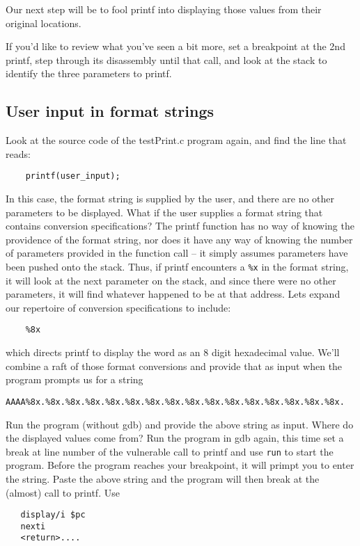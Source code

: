 Our next step will be to fool printf into displaying those values from their original locations.

If you'd like to review what you've seen a bit more, set a breakpoint at the 2nd printf, step through
its disassembly until that call, and look at the stack to identify the three parameters to printf.

\subsection{User input in format strings}
Look at the source code of the testPrint.c program again, and find the line that reads:
\begin{verbatim}
    printf(user_input);
\end{verbatim}
\noindent In this case, the format string is supplied by the user, and there are no other parameters to be
displayed.  What if the user supplies a format string that contains conversion specifications?  The printf
function has no way of knowing the providence of the format string, nor does it have any way of knowing the
number of parameters provided in the function call -- it simply assumes parameters have been pushed onto the
stack.  Thus, if printf encounters a {\tt \%x} in the format string, it will look at the next parameter on the
stack, and since there were no other parameters, it will find whatever happened to be at that address.
Lets expand our repertoire of conversion specifications to include:
\begin{verbatim}
    %8x
\end{verbatim}
\noindent which directs printf to display the word as an 8 digit hexadecimal value.  We'll combine a raft of
those format conversions and provide that as input when the program prompts us for a string
\begin{verbatim}
AAAA%8x.%8x.%8x.%8x.%8x.%8x.%8x.%8x.%8x.%8x.%8x.%8x.%8x.%8x.%8x.%8x.
\end{verbatim}
Run the program (without gdb) and provide the above string as input.  Where do the displayed values come from?
Run the program in gdb again, this time set a break at line number of the vulnerable call to printf and use {\tt run}
to start the program.  Before the program reaches your breakpoint, it will primpt you to enter the string.
Paste the above string and the program will then break at the (almost) call to printf.  Use
\begin{verbatim}
   display/i $pc
   nexti
   <return>....
\end{verbatim}
